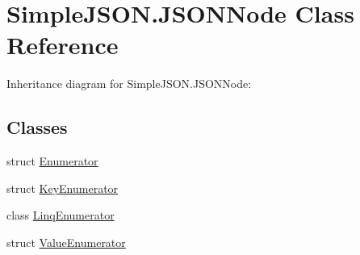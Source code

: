\hypertarget{classSimpleJSON_1_1JSONNode}{}\section{Simple\+J\+S\+O\+N.\+J\+S\+O\+N\+Node Class Reference}
\label{classSimpleJSON_1_1JSONNode}


Inheritance diagram for Simple\+J\+S\+O\+N.\+J\+S\+O\+N\+Node\+:
\subsection*{Classes}
\begin{DoxyCompactItemize}
\item 
struct \hyperlink{structSimpleJSON_1_1JSONNode_1_1Enumerator}{Enumerator}
\item 
struct \hyperlink{structSimpleJSON_1_1JSONNode_1_1KeyEnumerator}{Key\+Enumerator}
\item 
class \hyperlink{classSimpleJSON_1_1JSONNode_1_1LinqEnumerator}{Linq\+Enumerator}
\item 
struct \hyperlink{structSimpleJSON_1_1JSONNode_1_1ValueEnumerator}{Value\+Enumerator}
\end{DoxyCompactItemize}
